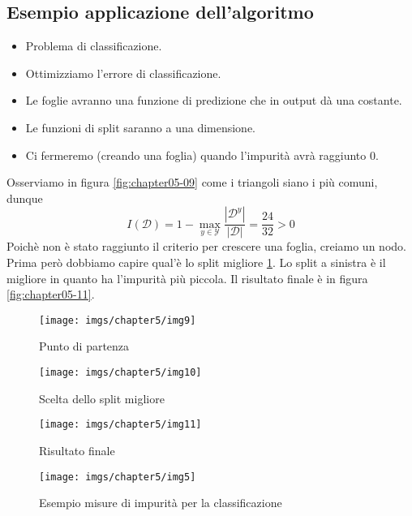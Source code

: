 	\subsection{Esempio applicazione dell'algoritmo}
	\begin{multicols}{2}
		\begin{itemize}
			\item Problema di classificazione.
			\item Ottimizziamo l'errore di classificazione.
			\item Le foglie avranno una funzione di predizione che in output d\`a una costante.
			\item Le funzioni di split saranno a una dimensione.
			\item Ci fermeremo (creando una foglia) quando l'impurit\`a avr\`a raggiunto $0$.
		\end{itemize}
	\end{multicols}
	Osserviamo in figura \ref{fig:chapter05-09} come i triangoli siano i pi\`u comuni, dunque  $$I(\mathcal{D})= 1 -\max\limits_{y\in\mathcal{Y}}\dfrac{|\mathcal{D}^y|}{|\mathcal{D}|} = \frac{24}{32} > 0$$
	Poich\`e non \`e stato raggiunto il criterio per crescere una foglia, creiamo un nodo. 
	Prima per\`o dobbiamo capire qual'\`e lo split migliore \ref{fig:chapter05-10}. 
	Lo split a sinistra \`e il migliore in quanto ha l'impurit\`a pi\`u piccola. 
	Il risultato finale \`e in figura \ref{fig:chapter05-11}.
	\begin{figure}
		\centering
		\begin{minipage}{.4\textwidth}
			\centering
			\texttt{[image: imgs/chapter5/img9]}
			\caption{Punto di partenza}
			\label{fig:chapter05-09}
		\end{minipage}%
		\begin{minipage}{.6\textwidth}
			\centering
			\texttt{[image: imgs/chapter5/img10]}
			\caption{Scelta dello split migliore}
			\label{fig:chapter05-10}
		\end{minipage}
	\end{figure}
	
	\begin{figure}
		\centering
		\begin{minipage}{.5\textwidth}
			\centering
			\texttt{[image: imgs/chapter5/img11]}
			\caption{Risultato finale}
			\label{fig:chapter05-11}
		\end{minipage}%
		\begin{minipage}{.5\textwidth}
			\centering
			\texttt{[image: imgs/chapter5/img5]}
			\caption{Esempio misure di impurit\`a per la classificazione}
			\label{fig:chapter05-05}
		\end{minipage}
	\end{figure}

